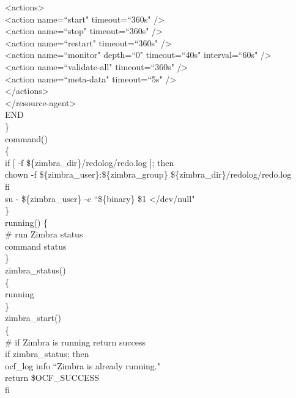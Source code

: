 \documentclass[a4paper, 12pt]{book}
\begin{document}
\noindent \textless actions\textgreater\\
\textless action name=``start"   timeout=``360s" /\textgreater\\
\textless action name=``stop"    timeout=``360s" /\textgreater\\
\textless action name=``restart"  timeout=``360s" /\textgreater\\
\textless action name=``monitor" depth=``0"  timeout=``40s" interval=``60s" /\textgreater\\
\textless action name=``validate-all"  timeout=``360s" /\textgreater\\
\textless action name=``meta-data"  timeout=``5s" /\textgreater\\
\textless /actions\textgreater\\
\textless /resource-agent\textgreater\\

\noindent END\\
\noindent \}\\

\noindent command()\\
\{\\
  \indent if [ -f \$\{zimbra\_dir\}/redolog/redo.log ]; then\\
  \indent \indent chown -f \$\{zimbra\_user\}:\$\{zimbra\_group\} \$\{zimbra\_dir\}/redolog/redo.log\\
  \indent fi\\
  \indent su - \$\{zimbra\_user\} -c ``\$\{binary\} \$1 \textless /dev/null"\\
\}\\

\noindent running() \{\\
\indent \# run Zimbra status\\
\indent  command status\\
\}\\


\noindent zimbra\_status()\\
\{\\
    \indent running\\
\}\\

\noindent zimbra\_start()\\
\{\\
    \indent \# if Zimbra is running return success\\
    \indent if zimbra\_status; then\\
    \indent \indent ocf\_log info ``Zimbra is already running."\\
    \indent \indent return \$OCF\_SUCCESS\\
    \indent fi\\
\end{document}

